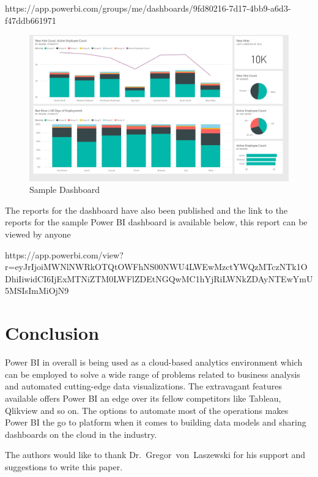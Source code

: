 https://app.powerbi.com/groups/me/dashboards/9fd80216-7d17-4bb9-a6d3-f47ddb661971

\begin{figure}[!ht]
  \centering\includegraphics[width=\columnwidth]{../images/dashboard.png}
  \caption{Sample Dashboard}\label{f:Dashboard}
\end{figure}

The reports for the dashboard have also been published and the link to the 
reports for the sample Power BI dashboard is available below, this report 
can be viewed by anyone 

https://app.powerbi.com/view?r=eyJrIjoiMWNlNWRkOTQtOWFhNS00NWU4LWEwMzctYWQzMTczNTk1ODhiIiwidCI6IjExMTNiZTM0LWFlZDEtNGQwMC1hYjRiLWNkZDAyNTEwYmU5MSIsImMiOjN9
 
\section{Conclusion}
Power BI in overall is being used as a cloud-based analytics environment which 
can be employed to solve a wide range of problems related to business analysis 
and automated cutting-edge data visualizations. The extravagant features 
available offers Power BI an edge over its fellow competitors like Tableau, 
Qlikview and so on. The options to automate most of the operations makes 
Power BI the go to platform when it comes to building data models and sharing 
dashboards on the cloud in the industry.
 
\begin{acks}

The authors would like to thank Dr.~Gregor~von~Laszewski for his
support and suggestions to write this paper.

\end{acks}


 